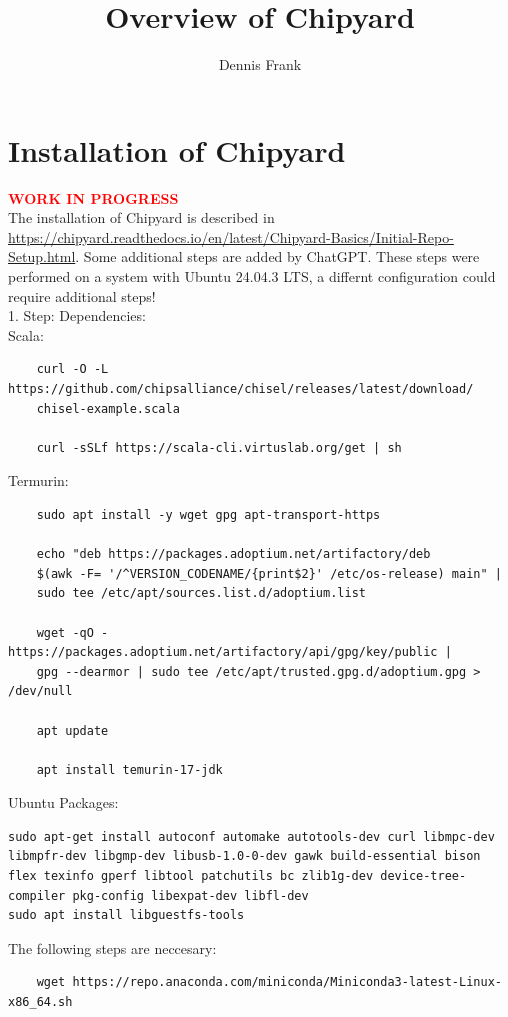 \documentclass{article}
\title{Overview of Chipyard}
\author{Dennis Frank}
\date{}
\begin{document}
\maketitle
 {\selectfont
\section*{Installation of Chipyard}
\textbf{\textcolor{red}{WORK IN PROGRESS}}\\
The installation of Chipyard is described in \url{https://chipyard.readthedocs.io/en/latest/Chipyard-Basics/Initial-Repo-Setup.html}. Some additional 
steps are added by ChatGPT. These steps were performed on a system with Ubuntu 24.04.3 LTS, a differnt configuration could require additional steps!\\ 
1. Step: Dependencies:\\
Scala:\\
\begin{verbatim}
    curl -O -L https://github.com/chipsalliance/chisel/releases/latest/download/
    chisel-example.scala

    curl -sSLf https://scala-cli.virtuslab.org/get | sh
\end{verbatim}
Termurin:\\
\begin{verbatim}
    sudo apt install -y wget gpg apt-transport-https

    echo "deb https://packages.adoptium.net/artifactory/deb 
    $(awk -F= '/^VERSION_CODENAME/{print$2}' /etc/os-release) main" | 
    sudo tee /etc/apt/sources.list.d/adoptium.list

    wget -qO - https://packages.adoptium.net/artifactory/api/gpg/key/public | 
    gpg --dearmor | sudo tee /etc/apt/trusted.gpg.d/adoptium.gpg > /dev/null

    apt update

    apt install temurin-17-jdk
\end{verbatim}
Ubuntu Packages:\\
\begin{verbatim}
sudo apt-get install autoconf automake autotools-dev curl libmpc-dev libmpfr-dev libgmp-dev libusb-1.0-0-dev gawk build-essential bison flex texinfo gperf libtool patchutils bc zlib1g-dev device-tree-compiler pkg-config libexpat-dev libfl-dev
sudo apt install libguestfs-tools 
\end{verbatim}
The following steps are neccesary:\\
\begin{verbatim}
    wget https://repo.anaconda.com/miniconda/Miniconda3-latest-Linux-x86_64.sh


\end{verbatim}}
\end{document}
